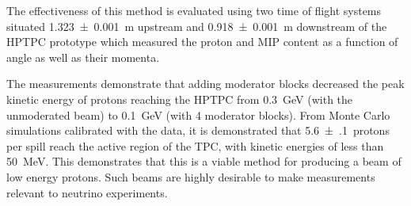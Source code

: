 The effectiveness of this method is evaluated using two time of flight systems situated \SI{1.323(1)}{\m} upstream and \SI{0.918(1)}{\m} downstream of the HPTPC prototype which measured the proton and MIP content as a function of angle as well as their momenta.

The measurements demonstrate that adding moderator blocks decreased the peak kinetic energy of protons reaching the HPTPC from \SI{0.3}{\GeV} (with the unmoderated beam) to \SI{0.1}{\GeV} (with 4 moderator blocks).
From Monte Carlo simulations calibrated with the data, it is demonstrated that \num{5.6(1)}~protons per spill reach the active region of the TPC, with kinetic energies of less than \SI{50}{\MeV}.
This demonstrates that this is a viable method for producing a beam of low energy protons. 
Such beams are highly desirable to make measurements relevant to neutrino experiments.
